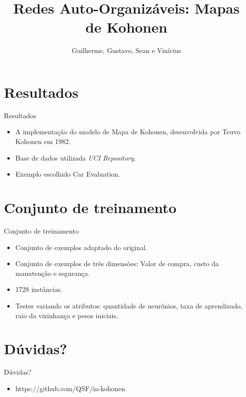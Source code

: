 \documentclass{beamer}
\title{Redes Auto-Organizáveis: Mapas de Kohonen}
\author{Guilherme, Gustavo, Sean e Vinícius}
\institute{Universidade Estadual de Londrina}
\begin{document}
\frame{\titlepage}



\section{Resultados}
\begin{frame}{Resultados}
	\begin{itemize}
	  \item A implementação do modelo de Mapa de Kohonen, desenvolvida por Teuvo Kohonen em 1982.
	  \item Base de dados utilizada \textit{UCI Repository}.
	  \item Exemplo escolhido Car Evaluation.
	\end{itemize}
\end{frame}

\section{Conjunto de treinamento}
\begin{frame}{Conjunto de treinamento}
	\begin{itemize}
	  \item Conjunto de exemplos adaptado do original. 
	  \item Conjunto de exemplos de três dimensões: Valor de compra, custo da manutenção e segurança.
	  \item 1728 instâncias.
	  \item Testes variando os atributos: quantidade de neurônios, taxa de aprendizado, raio da vizinhança e pesos iniciais.
	\end{itemize}
\end{frame}

\section{Dúvidas?}
\begin{frame}{Dúvidas?}
	\begin{itemize}
	  \item https://github.com/QSF/ia-kohonen
	\end{itemize}
\end{frame}
\end{document}
